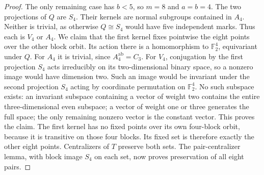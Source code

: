 \documentclass[11pt,a4paper]{article}
\begin{document}
\begin{proof}
The only remaining case has $b<5$, so $m=8$ and $a=b=4$.
The two projections of $Q$ are $S_4$. Their kernels are
normal subgroups contained in $A_4$. Neither is trivial,
as otherwise $Q\cong S_4$ would have five independent
marks. Thus each is $V_4$ or $A_4$.
We claim that the first kernel fixes pointwise the eight
points over the other block orbit. Its action there is a
homomorphism to $\mathbb F_2^4$, equivariant under $Q$.
For $A_4$ it is trivial, since $A_4^{\mathrm{ab}}=C_3$.
For $V_4$, conjugation by the first projection $S_4$ acts
irreducibly on its two-dimensional binary space, so a
nonzero image would have dimension two. Such an image would
be invariant under the second projection $S_4$ acting by
coordinate permutation on $\mathbb F_2^4$. No such subspace
exists: an invariant subspace containing a vector of weight
two contains the entire three-dimensional even subspace;
a vector of weight one or three generates the full space;
the only remaining nonzero vector is the constant vector.
This proves the claim. The first kernel has no fixed points
over its own four-block orbit, because it is transitive on
those four blocks. Its fixed set is therefore exactly the
other eight points. Centralizers of $T$ preserve both
sets. The pair-centralizer lemma, with block image $S_4$
on each set, now proves preservation of all eight pairs.
\end{proof}
\end{document}
